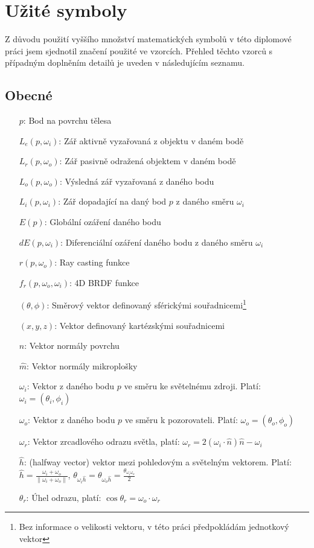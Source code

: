 \documentclass[czech,master]{diploma}
\newcommand{\uvec}[1]{\hat{#1}}
\newcommand{\point}{p}
\newcommand{\brdf}{f_r\left(\point,\omega_{o},\omega_{i}\right)}
\newcommand{\normVec}{\uvec{n}}
\newcommand{\normMicroVec}{\uvec{m}}
\newcommand{\inVec}{\omega_{i}}
\newcommand{\outVec}{\omega_{o}}
\newcommand{\refl}{\omega_{r}}
\newcommand{\halfVec}{\uvec{h}}
\newcommand{\reflRadiance}{L_r\left(\point,\outVec\right)}
\newcommand{\outRadiance}{L_o\left(\point,\outVec\right)}
\newcommand{\inRadiance}{L_i\left(\point,\inVec\right)}
\newcommand{\emitRadiance}{L_e\left(\point,\inVec\right)}
\newcommand{\rt}{r\left(\point,\outVec\right)}
\newcommand{\irradiance}{E\left(\point\right)}
\newcommand{\difirradiance}{dE\left(\point,\inVec\right)}
\begin{document}
\clearpage
\chapter{Užité symboly}
Z důvodu použití vyššího množství matematických symbolů v této diplomové práci jsem sjednotil značení použité ve vzorcích. Přehled těchto vzorců s případným doplněním detailů je uveden v následujícím seznamu.
\section{Obecné}
\begin{itemize}
  \item[\(p\):] Bod na povrchu tělesa
  \item[\(\emitRadiance\):] Zář aktivně vyzařovaná z objektu v daném bodě
  \item[\(\reflRadiance\):] Zář pasivně odražená objektem v daném bodě
  \item[\(\outRadiance\):] Výsledná zář vyzařovaná z daného bodu
  \item[\(\inRadiance\):] Zář dopadající na daný bod \(p\) z daného směru \(\inVec\)
  \item[\(\irradiance\):] Globální ozáření daného bodu
  \item[\(\difirradiance\):] Diferenciální ozáření daného bodu z daného směru \(\inVec\)
  \item[\(\rt\):] Ray casting funkce
  \item[\(\brdf\):] 4D BRDF funkce
  \item[\(\left(\theta,\phi\right)\):] Směrový vektor definovaný sférickými souřadnicemi\footnote{Bez informace o velikosti vektoru, v této práci předpokládám jednotkový vektor}
  \item[\(\left(x,y,z\right)\):] Vektor definovaný kartézskými souřadnicemi
  \item[\(\normVec\):] Vektor normály povrchu
  \item[\(\normMicroVec\):] Vektor normály mikroplošky
  \item[\(\inVec\):] Vektor z daného bodu \(p\) ve směru ke světelnému zdroji. Platí: \(\inVec = \left(\theta_i,\phi_i\right)\)
  \item[\(\outVec\):] Vektor z daného bodu \(p\) ve směru k pozorovateli. Platí: \(\outVec = \left(\theta_o,\phi_o\right)\)
  \item[\(\refl\):] Vektor zrcadlového odrazu světla, platí: \(\refl = 2\left(\inVec\cdot\normVec\right)\normVec-\inVec\)
  \item[\(\halfVec\):]  (halfway vector) vektor mezi pohledovým a světelným vektorem. Platí: \(\halfVec = \frac{\inVec + \outVec}{\| \inVec + \outVec\|}\), \(\theta_{\inVec\halfVec} = \theta_{\outVec\halfVec} = \frac{\theta_{\inVec\outVec}}{2} \)
  \item[\(\theta_r\):] Úhel odrazu, platí: \(\cos\theta_r = \outVec\cdot\refl\)
\end{itemize}
\end{document}
